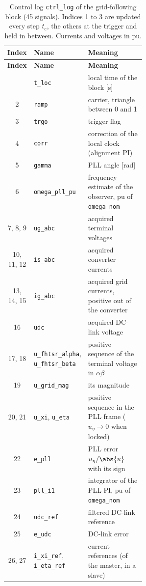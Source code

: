 \documentclass[11pt,a4paper]{scrartcl}
\newcommand{\ped}[1]{_{\mathrm{#1}}}
\newcommand{\code}[1]{\texttt{#1}}
\begin{document}
\begin{onehalfspace}
\small
\begin{longtable}{@{} c l p{0.56\linewidth} @{}}
	\caption[Control log of the grid-following block.]{Control log \code{ctrl\_log} of the grid-following block (45 signals). Indices 1 to 3 are updated every step $t\ped{c}$, the others at the trigger and held in between. Currents and voltages in pu.} \label{tab:log_gfl} \\
	\toprule
	\textbf{Index} & \textbf{Name} & \textbf{Meaning} \\
	\midrule
	\endfirsthead
	\toprule
	\textbf{Index} & \textbf{Name} & \textbf{Meaning} \\
	\midrule
	\endhead
	\bottomrule
	\endfoot
	\bottomrule
	\endlastfoot
	1 & \code{t\_loc} & local time of the block [\si{\second}] \\
	2 & \code{ramp} & carrier, triangle between 0 and 1 \\
	3 & \code{trgo} & trigger flag \\
	4 & \code{corr} & correction of the local clock (alignment PI) \\
	5 & \code{gamma} & PLL angle [\si{\radian}] \\
	6 & \code{omega\_pll\_pu} & frequency estimate of the observer, pu of \code{omega\_nom} \\
	7, 8, 9 & \code{ug\_abc} & acquired terminal voltages \\
	10, 11, 12 & \code{is\_abc} & acquired converter currents \\
	13, 14, 15 & \code{ig\_abc} & acquired grid currents, positive out of the converter \\
	16 & \code{udc} & acquired DC-link voltage \\
	17, 18 & \code{u\_fhtsr\_alpha}, \code{u\_fhtsr\_beta} & positive sequence of the terminal voltage in $\alpha\beta$ \\
	19 & \code{u\_grid\_mag} & its magnitude \\
	20, 21 & \code{u\_xi}, \code{u\_eta} & positive sequence in the PLL frame ($u_\eta \to 0$ when locked) \\
	22 & \code{e\_pll} & PLL error $u_\eta/\abs{u}$ with its sign \\
	23 & \code{pll\_i1} & integrator of the PLL PI, pu of \code{omega\_nom} \\
	24 & \code{udc\_ref} & filtered DC-link reference \\
	25 & \code{e\_udc} & DC-link error \\
	26, 27 & \code{i\_xi\_ref}, \code{i\_eta\_ref} & current references (of the master, in a slave) \\

\end{longtable}
\end{onehalfspace}
\end{document}
